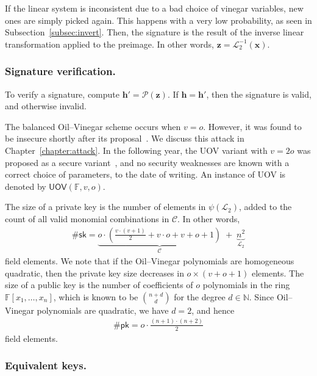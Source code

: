 \documentclass[12pt, a4paper, oneside]{memoir}
\theoremstyle{definition}
\begin{document}
If the linear system is inconsistent due to a bad choice of vinegar variables, new ones are simply picked again. This happens with a very low probability, as seen in Subsection~\ref{subsec:invert}. Then, the signature is the result of the inverse linear transformation applied to the preimage. In other words, $\mathbf{z} = \mathcal{L}_{2}^{-1}(\mathbf{x})$.

\subsubsection{Signature verification.}

To verify a signature, compute $\mathbf{h'} = \mathcal{P}(\mathbf{z})$. If $\mathbf{h} = \mathbf{h'}$, then the signature is valid, and otherwise invalid.

The balanced Oil--Vinegar scheme occurs when $v = o$. However, it was found to be insecure shortly after its proposal~\cite{Kipnis:199808}. We discuss this attack in Chapter~\ref{chapter:attack}. In the following year, the UOV variant with $v = 2o$ was proposed as a secure variant~\cite{Kipnis:199904}, and no security weaknesses are known with a correct choice of parameters, to the date of writing. An instance of UOV is denoted by $\mathsf{UOV}(\mathbb{F}, v, o)$. 

\vspace{4mm}\noindent
The size of a private key is the number of elements in $\psi(\mathcal{L}_{2})$, added to the count of all valid monomial combinations in $\mathcal{C}$. In other words,
\begin{align}
  \#\mathsf{sk} = \underbrace{o \cdot \left( \frac{v \cdot (v + 1)}{2} + v \cdot o + v + o + 1 \right)}_{\mathcal{C}} \;
    + \; \underbrace{n^{2}}_{\mathcal{L}_{2}}
\end{align}
field elements. We note that if the Oil--Vinegar polynomials are homogeneous quadratic, then the private key size decreases in $o \times (v + o + 1)$ elements. The size of a public key is the number of coefficients of $o$ polynomials in the ring $\mathbb{F}[x_{1}, \dots, x_{n}]$, which is known to be $\binom{n + d}{d}$ for the degree $d \in \mathbb{N}$. Since Oil--Vinegar polynomials are quadratic, we have $d = 2$, and hence
\begin{align}
  \#\mathsf{pk} = o \cdot \frac{(n + 1) \cdot (n + 2)}{2}
\end{align}
field elements.

\subsubsection{Equivalent keys.}
\end{document}
